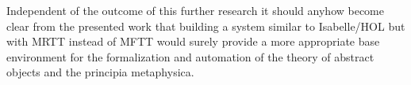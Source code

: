 \begin{isabellebody}
\begin{isamarkuptext}
 Independent of the outcome of this further research it should anyhow become clear from the presented 
 work that building a system similar to Isabelle/HOL but with MRTT instead of MFTT would surely provide
 a more appropriate base environment for the formalization and automation of the theory of abstract objects
 and the principia metaphysica.%
\end{isamarkuptext}%
\isamarkuptrue%
%
\isadelimtheory
%
\endisadelimtheory
%
\isatagtheory
%
\endisatagtheory
{\isafoldtheory}%
%
\isadelimtheory
\isanewline
%
\endisadelimtheory
\end{isabellebody}%
